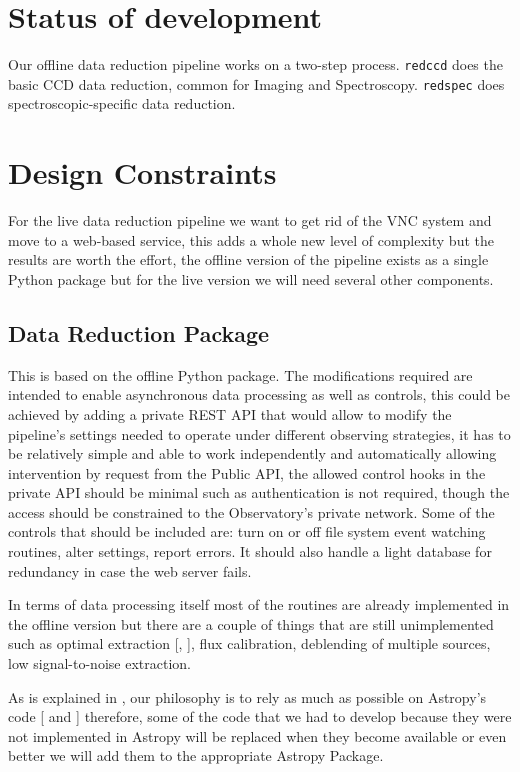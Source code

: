\documentclass[11pt,twoside]{article}
\begin{document}
\section{Status of development}


Our offline data reduction pipeline works on a two-step process. \verb=redccd= does the basic CCD data reduction, common for Imaging and Spectroscopy. \verb=redspec= does spectroscopic-specific data reduction.

\section{Design Constraints}

For the live data reduction pipeline we want to get rid of the VNC system and move to a web-based service, this adds a whole new level of complexity but the results are worth the effort, the offline version of the pipeline exists as a single Python package but for the live version  we will need several other components.

\subsection{Data Reduction Package}

This is based on the offline Python package. The modifications required are intended to enable asynchronous data processing as well as controls, this could be achieved by adding a private REST API that would allow to modify the pipeline's settings needed to operate under different observing strategies, it has to be relatively simple and able to work independently and automatically allowing intervention by request from the Public API, the allowed control hooks in the private API should be minimal such as authentication is not required, though the access should be constrained to the Observatory's private network. Some of the controls that should be included are: turn on or off file system event watching routines, alter settings, report errors. It should also handle a light database for redundancy in case the web server fails.

In terms of data processing itself most of the routines are already implemented in the offline version but there are a couple of things that are still unimplemented such as optimal extraction [\citet{1989PASP..101.1032M},  \citet{1986PASP...98..609H}], flux calibration, deblending of multiple sources, low signal-to-noise extraction.

As is explained in \citet{P9-115_adassxxvii}, our philosophy is to rely as much as possible on Astropy's code   [\citet{2013A&A...558A..33A} and \citet{2018AJ....156..123A}] therefore, some of the code that we had to develop because they were not implemented in Astropy will be replaced when they become available or even better we will add them to the appropriate Astropy Package.
\end{document}
